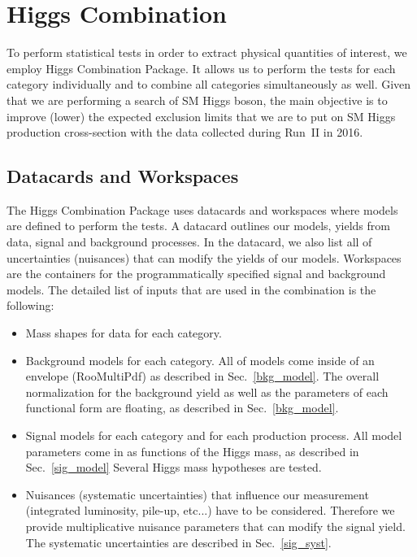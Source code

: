 \section{Higgs Combination} \label{section:higgs_combination}

%
%

To perform statistical tests in order to extract physical quantities of
interest, we employ Higgs Combination Package. It allows us to perform the
tests for each category individually and to combine all categories
simultaneously as well. Given that we are performing a search of SM Higgs
boson, the main objective is to improve (lower) the expected exclusion limits
that we are to put on SM Higgs production cross-section with the data
collected during Run~II in 2016.

\subsection{Datacards and Workspaces}
The Higgs Combination Package uses datacards and workspaces where models
are defined to perform the tests. A datacard outlines our models, yields
from data, signal and background processes. In the datacard, we also list all
of uncertainties (nuisances) that can modify the yields of our models.
Workspaces are the containers for the programmatically specified signal and
background models. The detailed list of inputs that are used in the combination
 is the following:

\begin{itemize}
    \item Mass shapes for data for each category.
    \item Background models for each category. All of models come inside of
an envelope (RooMultiPdf) as described in Sec.~\ref{bkg_model}. The overall
normalization for the background yield as well as the parameters of each
functional form are floating, as described in Sec.~\ref{bkg_model}.  %
    \item Signal models for each category and for each production process. All
model parameters come in as functions of the Higgs mass, as described in
Sec.~\ref{sig_model} %
Several Higgs mass hypotheses are tested.
    \item Nuisances (systematic uncertainties) that influence our
measurement (integrated luminosity, pile-up, etc...) have to be considered.
Therefore we provide multiplicative nuisance parameters that can modify the
signal yield. The systematic uncertainties are described in Sec.~\ref{sig_syst}.
\end{itemize}

